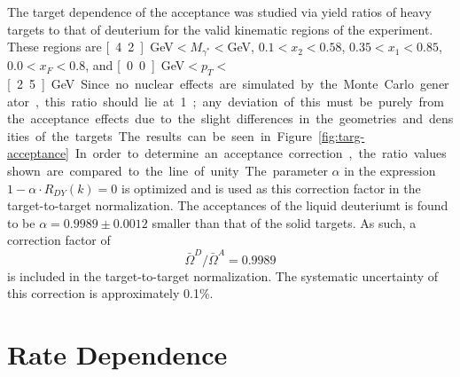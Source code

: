 The target dependence of the acceptance was studied via yield ratios of heavy targets to that of deuterium for the valid kinematic regions of the experiment. These regions are \unit[4.2]{GeV}$<M_{\gamma^*}<$\unit[10]{GeV}, $0.1<x_2<0.58$, $0.35<x_1<0.85$, $0.0<x_F<0.8$, and \unit[0.0]{GeV}$<p_T<$\unit[2.5]{GeV}. Since no nuclear effects are simulated by the Monte Carlo generator, this ratio should lie at 1; any deviation of this must be purely from the acceptance effects due to the slight differences in the geometries and densities of the targets. The results can be seen in Figure~\ref{fig:targ-acceptance}.

In order to determine an acceptance correction, the ratio values shown are compared to the line of unity. The parameter $\alpha$ in the expression $1 - \alpha \cdot R_{DY}(k) = 0$ is optimized and is used as this correction factor in the target-to-target normalization. The acceptances of the liquid deuteriumt is found to be $\alpha = 0.9989 \pm 0.0012$ smaller than that of the solid targets. As such, a correction factor of $$\bar{\Omega}^D/\bar{\Omega}^A = 0.9989$$ is included in the target-to-target normalization. The systematic uncertainty of this correction is approximately 0.1\%.

\section{Rate Dependence}

